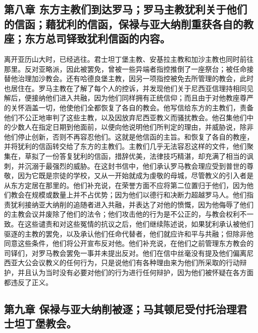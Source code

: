 
\subsection{第八章 东方主教们到达罗马；罗马主教犹利关于他们的信函；藉犹利的信函，保禄与亚大纳削重获各自的教座；东方总司铎致犹利信函的内容。}

离开亚历山大时，已经逃往。君士坦丁堡主教、安基拉主教和加沙主教也同时前往那里。反对亚略派，因此被罢免，曾被一些异端者指控推倒了一座祭台；被任命接替他治理加沙教会。还有哈德良堡主教，因另一项指控被免去所管理的教会，此时也居住在。罗马主教在了解了每个人的控诉，并发现他们关于尼西亚信理持相同见解后，便接纳他们进入共融，因为他们同样拥有正统信仰；而且由于对他教座尊严的关怀涵盖一切，他使他们全都恢复了各自的教会。他写信给东方的主教们，责备他们不公正地审判了这些主教，以及因放弃尼西亚教义而骚扰教会。他召集他们中的少数人在指定日期到他面前，以便向他说明他们所判定的理由，并威胁说，除非他们停止创新，否则不再容忍他们。这就是他信函的主旨。和恢复了各自的教座，并将犹利的信函转交给了东方的主教们。主教们几乎无法容忍这样的文件，他们聚集在，草拟了一份答复犹利的信函，措辞优美，法律技巧精湛，却充满了相当的讽刺，并沉溺于最强烈的威胁。在这封书信中，他们承认罗马教会理应受到普世的尊敬，因为它既是宗徒的学校，又从一开始就成为虔敬的母城，尽管教义的引入者是从东方定居在那里的。他们补充说，在荣誉方面不应将第二位置归于他们，因为他们教会在规模或数量上并不占优势；因为他们以德行和决断力超越罗马人。他们指责犹利接纳亚大纳削的追随者进入共融，并表达了对他的愤慨，因为他侮辱了他们的主教会议并废除了他们的法令；他们攻击他的行为是不公正的，与教会权利不一致。在这些谴责和对这些冤情的抗议之后，他们继续陈述说，如果犹利承认被他们驱逐的主教的罢免，以及承认他们任命代替者，他们就应许和平与共融；但除非他同意这些条件，他们将公开宣布反对他。他们补充说，在他们之前管理东方教会的司铎们，对罗马教会罢免一事并未提出反对。他们在信中丝毫没有提及他们偏离尼西亚大公会议教义的任何行为，只是说他们有各种理由来为他们所采取的行动辩护，并且认为当时没有必要对他们的行为进行任何辩护，因为他们被怀疑在各方面都违反了正义。\par


\subsection{第九章 保禄与亚大纳削被逐；马其顿尼受付托治理君士坦丁堡教会。}

